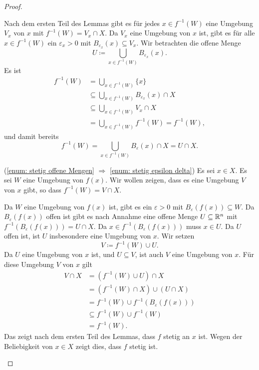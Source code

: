 \documentclass[a4paper,10pt]{article}
\begin{document}
\begin{proof}
\begin{enumerate}
   Nach dem ersten Teil des Lemmas gibt es für jedes $x \in f^{-1}(W)$ eine Umgebung $V_x$ von $x$ mit $f^{-1}(W) = V_x \cap X$. Da $V_x$ eine Umgebung von $x$ ist, gibt es für alle $x \in f^{-1}(W)$ ein $\varepsilon_x > 0$ mit $B_{\varepsilon_x}(x) \subseteq V_x$. Wir betrachten die offene Menge
   \[
    U \coloneqq \bigcup_{x \in f^{-1}(W)} B_{\varepsilon_x}(x).
   \]
   Es ist
   \begin{align*}
    f^{-1}(W)
    &= \bigcup_{x \in f^{-1}(W)} \{x\} \\
    &\subseteq \bigcup_{x \in f^{-1}(W)} B_{\varepsilon_x}(x) \cap X \\
    &\subseteq \bigcup_{x \in f^{-1}(W)} V_x \cap X \\
    &= \bigcup_{x \in f^{-1}(W)} f^{-1}(W)
     = f^{-1}(W),
   \end{align*}
   und damit bereits
   \[
    f^{-1}(W)
    = \bigcup_{x \in f^{-1}(W)} B_\varepsilon(x) \cap X
    =  U \cap X.
   \]
   
   (\ref{enum: stetig offene Mengen} $\Rightarrow$ \ref{enum: stetig epsilon delta}) Es sei $x \in X$. Es sei $W$ eine Umgebung von $f(x)$. Wir wollen zeigen, dass es eine Umgebung $V$ von $x$ gibt, so dass $f^{-1}(W) = V \cap X$.
   
   Da $W$ eine Umgebung von $f(x)$ ist, gibt es ein $\varepsilon > 0$ mit $B_\varepsilon(f(x)) \subseteq W$. Da $B_\varepsilon(f(x))$ offen ist gibt es nach Annahme eine offene Menge $U \subseteq \mathbb{R}^n$ mit $f^{-1}(B_\varepsilon(f(x))) = U \cap X$. Da $x \in f^{-1}(B_\varepsilon(f(x)))$ muss $x \in U$. Da $U$ offen ist, ist $U$ insbesondere eine Umgebung von $x$. Wir setzen
   \[
    V \coloneqq f^{-1}(W) \cup U.
   \]
   Da $U$ eine Umgebung von $x$ ist, und $U \subseteq V$, ist auch $V$ eine Umgebung von $x$. Für diese Umgebung $V$ von $x$ gilt
   \begin{align*}
    V \cap X
    &= (f^{-1}(W) \cup U) \cap X \\
    &= (f^{-1}(W) \cap X) \cup (U \cap X) \\
    &= f^{-1}(W) \cup f^{-1}(B_\varepsilon(f(x))) \\
    &\subseteq f^{-1}(W) \cup f^{-1}(W) \\
    &= f^{-1}(W).
   \end{align*}
   Das zeigt nach dem ersten Teil des Lemmas, dass $f$ stetig an $x$ ist. Wegen der Beliebigkeit von $x \in X$ zeigt dies, dass $f$ stetig ist.
  \qedhere
 \end{enumerate}
\end{proof}
\end{document}
